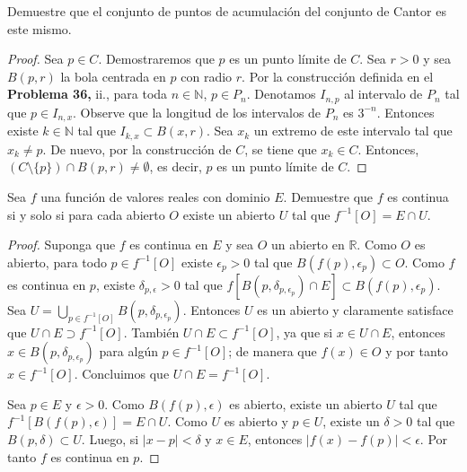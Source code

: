 \documentclass[12pt]{article}
\newcommand{\N}{\mathbb{N}}
\newcommand{\R}{\mathbb{R}}
\newenvironment{problem}[2][Problema]{\begin{trivlist}
\item[\hskip \labelsep {\bfseries #1}\hskip \labelsep {\bfseries #2.}]}{\end{trivlist}}
\begin{document}
\begin{problem}{38}
Demuestre que el conjunto de puntos de acumulación del conjunto de Cantor es este mismo.
\end{problem}
\begin{proof}
Sea $p \in C$. Demostraremos que $p$ es un punto límite de $C$. Sea $r > 0$ y sea $B(p, r)$ la bola centrada en $p$ con radio $r.$ Por la construcción definida en el \textbf{Problema 36, } ii., para toda $n\in \N$, $  p \in P_n$. Denotamos $I_{n,p}$ al intervalo de $P_n$ tal que $p \in I_{n,x}$. Observe que la longitud de los intervalos  de $P_n$ es $3^{-n}$. Entonces existe $k \in \N$ tal que $I_{k, x} \subset B(x, r)$. Sea $x_k$ un extremo de este intervalo tal que $x_k \neq p$. De nuevo, por la construcción de $C$, se tiene que $x_k \in C$. Entonces, $(C\setminus \{p\}) \cap B(p, r) \neq \emptyset$, es decir, $p$ es un punto límite de $C$.


\end{proof}


\begin{problem}{40}
Sea $f$ una función de valores reales con dominio $E.$ Demuestre que $f$ es continua si y solo si para cada abierto $O$ existe un abierto $U$ tal que $f^{-1}[O] = E \cap U.$ 
\end{problem}
\begin{proof}
Suponga que $f$ es continua en $E$ y sea $O$ un abierto en $\R$. Como $O$ es abierto, para todo $p\in f^{-1}[O]$ existe $\epsilon_{p} > 0$ tal que $B(f(p), \epsilon_p) \subset O$. Como $f$ es continua en $p$, existe $\delta_{p, \epsilon} > 0$ tal que $f[B(p, \delta_{p, \epsilon_p} ) \cap E] \subset B(f(p), \epsilon_p).$ Sea $U = \bigcup_{p\in f^{-1}[O]} B(p, \delta_{p, \epsilon_p})$. Entonces $U$ es un abierto y claramente satisface que $U \cap E \supset f^{-1}[O].$ También $U \cap E \subset f^{-1}[O]$, ya que si $x \in U \cap E$, entonces $x \in B(p, \delta_{p,\epsilon_p})$ para algún $p \in f^{-1}[O]$; de manera que $f(x) \in O$ y por tanto $x \in f^{-1}[O]$. Concluimos que $U \cap E = f^{-1}[O]$.

Sea $p \in E$ y $\epsilon > 0$. Como $B(f(p), \epsilon)$ es abierto, existe un abierto $U$ tal que $f^{-1}[B(f(p), \epsilon)] = E \cap U.$ Como $U$ es abierto y $p \in U$, existe un $\delta > 0$ tal que $B(p, \delta) \subset U$. Luego, si $\lvert x - p \lvert < \delta $ y $x \in E$, entonces $\lvert f(x) - f(p) \lvert < \epsilon$. Por tanto $f$ es continua en $p$.
\end{proof}
\end{document}
